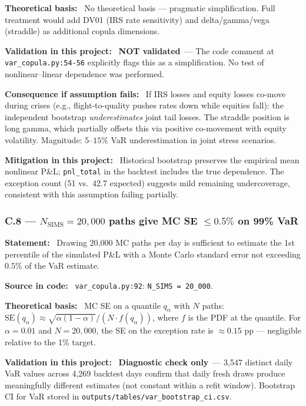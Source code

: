 \documentclass[11pt,a4paper]{article}
\newcommand{\asmfield}[1]{\medskip\noindent\textbf{#1:}\ }
\newcommand{\code}[1]{\texttt{#1}}
\newcommand{\diagnostic}{\textbf{Diagnostic check only}}
\newcommand{\notvalidated}{\textbf{NOT validated}}
\begin{document}
\asmfield{Theoretical basis}
No theoretical basis --- pragmatic simplification. Full treatment would
add DV01 (IRS rate sensitivity) and delta/gamma/vega (straddle) as
additional copula dimensions.

\asmfield{Validation in this project}
\notvalidated\ --- The code comment at \code{var\_copula.py:54-56} explicitly
flags this as a simplification. No test of nonlinear--linear dependence
was performed.

\asmfield{Consequence if assumption fails}
If IRS losses and equity losses co-move during crises (e.g., flight-to-quality
pushes rates down while equities fall): the independent bootstrap
\emph{underestimates} joint tail losses. The straddle position is long
gamma, which partially offsets this via positive co-movement with equity
volatility. Magnitude: $5$--$15\%$ VaR underestimation in joint stress scenarios.

\asmfield{Mitigation in this project}
Historical bootstrap preserves the empirical mean nonlinear P\&L;
\code{pnl\_total} in the backtest includes the true dependence. The
exception count (51 vs.\ 42.7 expected) suggests mild remaining
undercoverage, consistent with this assumption failing partially.

\subsubsection{C.8 --- $N_{\mathrm{SIMS}} = 20{,}000$ paths give MC SE $\le 0.5\%$ on 99\% VaR}\label{asm:C8}

\asmfield{Statement}
Drawing 20{,}000 MC paths per day is sufficient to estimate the 1st
percentile of the simulated P\&L with a Monte Carlo standard error not
exceeding $0.5\%$ of the VaR estimate.

\asmfield{Source in code}
\code{var\_copula.py:92}: \lstinline|N_SIMS = 20_000|.

\asmfield{Theoretical basis}
MC SE on a quantile $q_\alpha$ with $N$ paths:
$\text{SE}(q_\alpha) \approx \sqrt{\alpha(1-\alpha)} / (N \cdot f(q_\alpha))$,
where $f$ is the PDF at the quantile. For $\alpha = 0.01$ and $N = 20{,}000$,
the SE on the exception rate is $\approx 0.15$ pp --- negligible relative
to the 1\% target.

\asmfield{Validation in this project}
\diagnostic\ --- 3{,}547 distinct daily VaR values across 4{,}269 backtest
days confirm that daily fresh draws produce meaningfully different estimates
(not constant within a refit window). Bootstrap CI for VaR stored in
\code{outputs/tables/var\_bootstrap\_ci.csv}.
\end{document}
